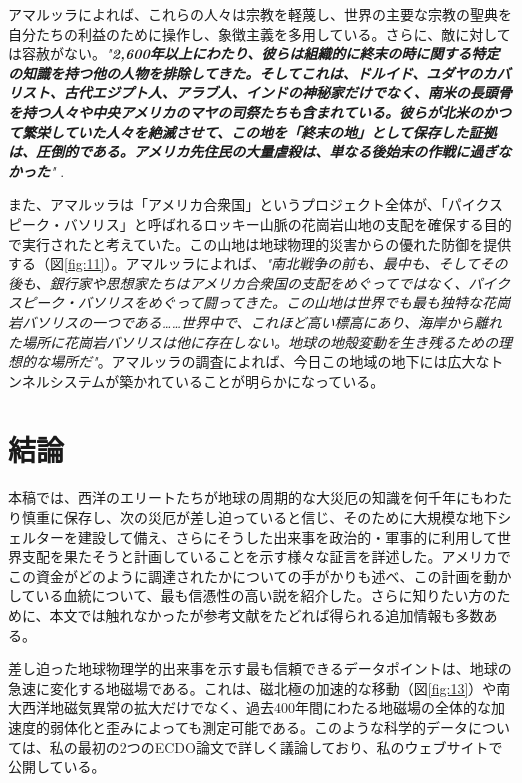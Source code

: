 \documentclass[10pt,twocolumn,letterpaper]{article}
\begin{document}
アマルッラによれば、これらの人々は宗教を軽蔑し、世界の主要な宗教の聖典を自分たちの利益のために操作し、象徴主義を多用している。さらに、敵に対しては容赦がない。\textit{"\textbf{2,600年以上にわたり、彼らは組織的に終末の時に関する特定の知識を持つ他の人物を排除してきた。そしてこれは、ドルイド、ユダヤのカバリスト、古代エジプト人、アラブ人、インドの神秘家だけでなく、南米の長頭骨を持つ人々や中央アメリカのマヤの司祭たちも含まれている。彼らが北米のかつて繁栄していた人々を絶滅させて、この地を「終末の地」として保存した証拠は、圧倒的である。アメリカ先住民の大量虐殺は、単なる後始末の作戦に過ぎなかった}"} \cite{33,34}.

また、アマルッラは「アメリカ合衆国」というプロジェクト全体が、「パイクスピーク・バソリス」と呼ばれるロッキー山脈の花崗岩山地の支配を確保する目的で実行されたと考えていた。この山地は地球物理的災害からの優れた防御を提供する（図\ref{fig:11}）。アマルッラによれば、\textit{"南北戦争の前も、最中も、そしてその後も、銀行家や思想家たちはアメリカ合衆国の支配をめぐってではなく、パイクスピーク・バソリスをめぐって闘ってきた。この山地は世界でも最も独特な花崗岩バソリスの一つである……世界中で、これほど高い標高にあり、海岸から離れた場所に花崗岩バソリスは他に存在しない。地球の地殻変動を生き残るための理想的な場所だ"}\cite{33,34}。アマルッラの調査によれば、今日この地域の地下には広大なトンネルシステムが築かれていることが明らかになっている\cite{36}。

\section{結論}

本稿では、西洋のエリートたちが地球の周期的な大災厄の知識を何千年にもわたり慎重に保存し、次の災厄が差し迫っていると信じ、そのために大規模な地下シェルターを建設して備え、さらにそうした出来事を政治的・軍事的に利用して世界支配を果たそうと計画していることを示す様々な証言を詳述した。アメリカでこの資金がどのように調達されたかについての手がかりも述べ、この計画を動かしている血統について、最も信憑性の高い説を紹介した。さらに知りたい方のために、本文では触れなかったが参考文献をたどれば得られる追加情報も多数ある。

差し迫った地球物理学的出来事を示す最も信頼できるデータポイントは、地球の急速に変化する地磁場である。これは、磁北極の加速的な移動（図\ref{fig:13}）や南大西洋地磁気異常の拡大だけでなく、過去400年間にわたる地磁場の全体的な加速度的弱体化と歪みによっても測定可能である\cite{3}。このような科学的データについては、私の最初の2つのECDO論文で詳しく議論しており、私のウェブサイトで公開している\cite{3}。
\end{document}
